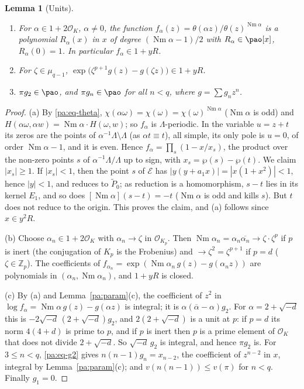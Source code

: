 \documentclass[10pt]{amsart}
\newtheorem{lemma}[theorem]{Lemma}
\theoremstyle{definition}
\theoremstyle{remark}
\newcommand{\Z}{\mathbb Z}
\providecommand{\auNm}{\operatorname{Nm}}
\providecommand{\auO}{\mathcal O}
\providecommand{\aubar}[1]{\overline{#1}}
\begin{document}
\begin{lemma}[Units]\label{pa:units}
\begin{enumerate}
\item[(a)] For $\alpha\in1+2\auO_K$, $\alpha\ne0$, the function $f_\alpha(z)=\theta(\alpha z)/
\theta(z)^{\auNm\alpha}$ is a polynomial $R_\alpha(x)$ in $x$ of degree $(\auNm\alpha-1)/2$ with
$R_\alpha\in\pao[x]$, $R_\alpha(0)=1$. In particular $f_\alpha\in1+yR$.
\item[(b)] For $\zeta\in\mu_{q-1}$, $\exp\bigl(\zeta^{p+1}g(z)-g(\zeta z)\bigr)\in1+yR$.
\item[(c)] $\pi g_2\in\pao$, and $\pi g_n\in\pao$ for all $n<q$, where $g=\sum g_nz^n$.
\end{enumerate}
\end{lemma}
\begin{proof}
(a) By \eqref{pa:eq-theta}, $\chi(\alpha\omega)=\chi(\omega)=\chi(\omega)^{\auNm\alpha}$
($\auNm\alpha$ is odd) and $H(\alpha\omega,\alpha w)=\auNm\alpha\cdot H(\omega,w)$; so $f_\alpha$ is
$\Lambda$-periodic. In the variable $u=z+t$ its zeros are the points of
$\alpha^{-1}\Lambda\setminus\Lambda$ (as $\alpha t\equiv t$), all simple, its only pole is $u=0$,
of order $\auNm\alpha-1$, and it is even. Hence $f_\alpha=\prod_s(1-x/x_s)$, the product over the
non-zero points $s$ of $\alpha^{-1}\Lambda/\Lambda$ up to sign, with $x_s=\wp(s)-\wp(t)$. We claim
$|x_s|\ge1$. If $|x_s|<1$, then the point $s$ of $\mathcal E$ has $|y(y+a_1x)|=|x(1+x^2)|<1$, hence
$|y|<1$, and reduces to $\widetilde P_0$; as reduction is a homomorphism, $s-t$ lies in its kernel
$E_1$, and so does $[\auNm\alpha](s-t)=-t$ ($\auNm\alpha$ is odd and kills $s$). But $t$ does not
reduce to the origin. This proves the claim, and (a) follows since $x\in y^2R$.

(b) Choose $\alpha_n\in1+2\auO_K$ with $\alpha_n\to\zeta$ in $\auO_{K_p}$. Then
$\auNm\alpha_n=\alpha_n\aubar{\alpha_n}\to\zeta\cdot\zeta^{p}$ if $p$ is inert (the conjugation of
$K_p$ is the Frobenius) and $\to\zeta^2=\zeta^{p+1}$ if $p=d$ ($\zeta\in\Z_p$). The coefficients of
$f_{\alpha_n}=\exp(\auNm\alpha_n\,g(z)-g(\alpha_nz))$ are polynomials in
$(\alpha_n,\auNm\alpha_n)$, and $1+yR$ is closed.

(c) By (a) and Lemma~\ref{pa:param}(c), the coefficient of $z^2$ in $\log f_\alpha=\auNm\alpha\,
g(z)-g(\alpha z)$ is integral; it is $\alpha(\aubar\alpha-\alpha)g_2$. For
$\alpha=2+\sqrt{-d}$ this is $-2\sqrt{-d}\,(2+\sqrt{-d})g_2$, and $2(2+\sqrt{-d})$ is a unit at
$p$: if $p=d$ its norm $4(4+d)$ is prime to $p$, and if $p$ is inert then $p$ is a prime element
of $\auO_K$ that does not divide $2+\sqrt{-d}$. So $\sqrt{-d}\,g_2$ is integral, and hence
$\pi g_2$ is. For $3\le n<q$, \eqref{pa:eq-g2} gives
$n(n-1)g_n=x_{n-2}$, the coefficient of $z^{n-2}$ in $x$, integral by Lemma~\ref{pa:param}(c); and
$v(n(n-1))\le v(\pi)$ for $n<q$. Finally $g_1=0$.
\end{proof}
\end{document}

